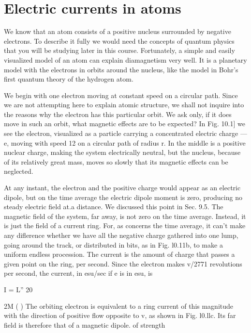  
\iffalse

\section{Electric currents in atoms}

We know that an atom consists of a positive nucleus surrounded
by negative electrons. To describe it fully we would need the concepts
of quantum physics that you will be studying later in this
course. Fortunately, a simple and easily visualized model of an
atom can explain diamagnetism very well. It is a planetary model
with the electrons in orbits around the nucleus, like the model in
Bohr's first quantum theory of the hydrogen atom.

We begin with one electron moving at constant speed on a circular
path. Since we are not attempting here to explain atomic structure,
we shall not inquire into the reasons why the electron has this particular
orbit. We ask only, if it does move in such an orbit, what
magnetic effects are to be expected? In Fig. 10.1] we see the 
electron, visualized as a particle carrying a concentrated electric charge
 ---  e, moving with speed 12 on a circular path of radius r. In the middle
is a positive nuclear charge, making the system electrically neutral,
but the nucleus, because of its relatively great mass, moves so slowly
that its magnetic effects can be neglected.

At any instant, the electron and the positive charge would appear
as an electric dipole, but on the time average the electric dipole
moment is zero, producing no steady electric field at.a distance. We
discussed this point in Sec. 9.5. The magnetic field of the system,
far away, is not zero on the time average. Instead, it is just the field
of a current ring. For, as concerns the time average, it can't make
any diflerence whether we have all the negative charge gathered into
one lump, going around the track, or distributed in bits, as in
Fig. l0.11b, to make a uniform endless procession. The current is
the amount of charge that passes a given point on the ring, per
second. Since the electron makes v/2771 revolutions per second, the
current, in esu/sec if e is in esu, is
\begin{equation}
\end{equation}

I = L'' 20

2M ( )
The orbiting electron is equivalent to a ring current of this magnitude
with the direction of positive flow opposite to v, as shown in
Fig. l0.llc. Its far field is therefore that of a magnetic dipole. of
strength
\begin{equation}
\end{equation}

